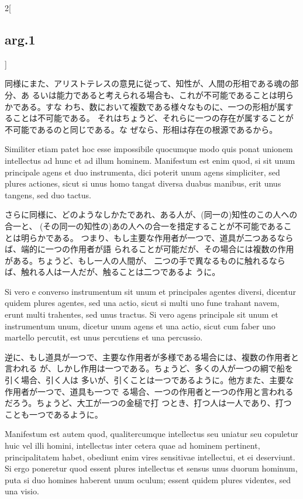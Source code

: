 \documentclass[paper=a4paper,fontsize=10pt,jafontsize=9pt,titlepage]{jlreq}
\begin{document}
\begin{paracol}{2}[\subsection{arg.1}]
\switchcolumn

 同様にまた、アリストテレスの意見に従って、知性が、人間の形相である魂の部分、あ
 るいは能力であると考えられる場合も、これが不可能であることは明らかである。すな
 わち、数において複数である様々なものに、一つの形相が属することは不可能である。
 それはちょうど、それらに一つの存在が属することが不可能であるのと同じである。な
 ぜなら、形相は存在の根源であるから。\switchcolumn*


 Similiter etiam patet hoc esse impossibile quocumque modo quis ponat unionem
 intellectus ad hunc et ad illum hominem. Manifestum est enim quod, si sit unum
 principale agens et duo instrumenta, dici poterit unum agens simpliciter, sed
 plures actiones, sicut si unus homo tangat diversa duabus manibus, erit unus
 tangens, sed duo tactus.

\switchcolumn

 さらに同様に、どのようなしかたであれ、ある人が、(同一の)知性のこの人への合一と、
 (その同一の知性の)あの人への合一を措定することが不可能であることは明らかである。
 つまり、もし主要な作用者が一つで、道具が二つあるならば、端的に一つの作用者が語
 られることが可能だが、その場合には複数の作用がある。ちょうど、もし一人の人間が、
 二つの手で異なるものに触れるならば、触れる人は一人だが、触ることは二つであるよ
 うに。

 \switchcolumn*


 Si vero e converso instrumentum sit unum et principales agentes diversi,
 dicentur quidem plures agentes, sed una actio, sicut si multi uno fune trahant
 navem, erunt multi trahentes, sed unus tractus. Si vero agens principale sit
 unum et instrumentum unum, dicetur unum agens et una actio, sicut cum faber uno
 martello percutit, est unus percutiens et una percussio.

\switchcolumn

逆に、もし道具が一つで、主要な作用者が多様である場合には、複数の作用者と言われる
が、しかし作用は一つである。ちょうど、多くの人が一つの綱で船を引く場合、引く人は
多いが、引くことは一つであるように。他方また、主要な作用者が一つで、道具も一つで
る場合、一つの作用者と一つの作用と言われるだろう。ちょうど、大工が一つの金槌で打
つとき、打つ人は一人であり、打つことも一つであるように。
 
\switchcolumn*

 Manifestum est autem quod, qualitercumque intellectus seu uniatur seu copuletur
 huic vel illi homini, intellectus inter cetera quae ad hominem pertinent,
 principalitatem habet, obediunt enim vires sensitivae intellectui, et ei
 deserviunt. Si ergo poneretur quod essent plures intellectus et sensus unus
 duorum hominum, puta si duo homines haberent unum oculum; essent quidem plures
 videntes, sed una visio.


\end{paracol}
\end{document}
